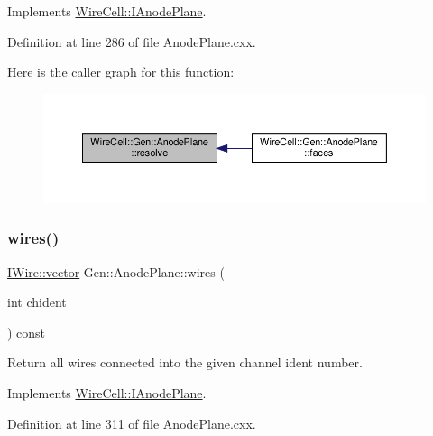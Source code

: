 Implements \hyperlink{class_wire_cell_1_1_i_anode_plane_a566ba20aec7e85b99a9f4304f073afa0}{Wire\+Cell\+::\+I\+Anode\+Plane}.



Definition at line 286 of file Anode\+Plane.\+cxx.

Here is the caller graph for this function\+:
\nopagebreak
\begin{figure}[H]
\begin{center}
\leavevmode
\includegraphics[width=350pt]{class_wire_cell_1_1_gen_1_1_anode_plane_abfe29b697f36910a6b7a08c9e4b984bd_icgraph}
\end{center}
\end{figure}
\mbox{\label{class_wire_cell_1_1_gen_1_1_anode_plane_ad16d32c787a7ee9ea8c6c556bbab2e4f}} 
\subsubsection{\texorpdfstring{wires()}{wires()}}
{\footnotesize\ttfamily \hyperlink{class_wire_cell_1_1_i_data_ae1a9f863380499bb43f39fabb6276660}{I\+Wire\+::vector} Gen\+::\+Anode\+Plane\+::wires (\begin{DoxyParamCaption}\item[{int}]{chident }\end{DoxyParamCaption}) const\hspace{0.3cm}{\ttfamily [virtual]}}



Return all wires connected into the given channel ident number. 



Implements \hyperlink{class_wire_cell_1_1_i_anode_plane_a58f3e7e47cfe10a141e0275f80dcc789}{Wire\+Cell\+::\+I\+Anode\+Plane}.



Definition at line 311 of file Anode\+Plane.\+cxx.

